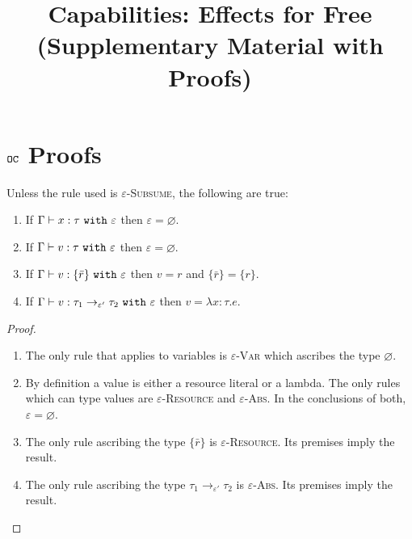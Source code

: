 \documentclass[a4paper,UKenglish]{lipics-v2016}
\begin{document}
\title{Capabilities: Effects for Free (Supplementary Material with Proofs)}


\author{}


\maketitle


\section{$\mathtt{OC}$ Proofs}


\begin{lemma}
Unless the rule used is \textsc{$\varepsilon$-Subsume}, the following are true:
\begin{enumerate}
	\item If $\Gamma \vdash x: \tau~\mathtt{with}~ \varepsilon$ then $\varepsilon = \varnothing$.
	\item If $ \Gamma \vdash  v:  \tau~\mathtt{with}~ \varepsilon$ then $\varepsilon = \varnothing$.
	\item If $ \Gamma \vdash v: \{ \bar r \}~\mathtt{with}~ \varepsilon$ then $ v = r$ and $\{ \bar r \} = \{ r \}$.
	\item If $\Gamma \vdash v: \tau_1 \rightarrow_{\varepsilon'} \tau_2~\mathtt{with}~ \varepsilon$ then $v = \lambda x:\tau. e$.
\end{enumerate}
\end{lemma}


\begin{proof}
~
\begin{enumerate}
	\item The only rule that applies to variables is \textsc{$\varepsilon$-Var} which ascribes the type $\varnothing$.
	\item By definition a value is either a resource literal or a lambda. The only rules which can type values are \textsc{$\varepsilon$-Resource} and \textsc{$\varepsilon$-Abs}. In the conclusions of both, $\varepsilon = \varnothing$.
	\item The only rule ascribing the type $\{ \bar r \}$ is \textsc{$\varepsilon$-Resource}. Its premises imply the result.
	\item The only rule ascribing the type $\tau_1 \rightarrow_{\varepsilon'} \tau_2$ is \textsc{$\varepsilon$-Abs}. Its premises imply the result.
\end{enumerate}
\end{proof}


\hrulefill
\end{document}
